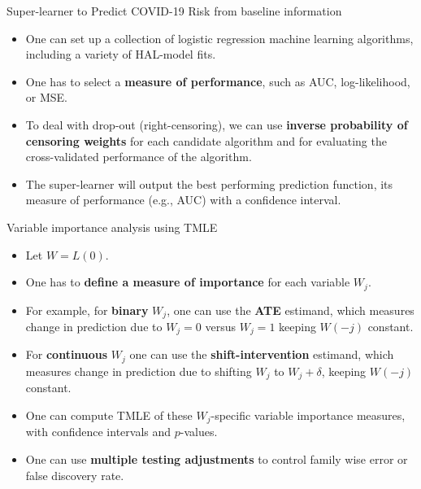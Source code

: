 \documentclass[t]{beamer}
\begin{document}
\begin{frame}{Super-learner to Predict COVID-19 Risk from baseline information}
\begin{itemize}
\item One can set up a collection of logistic regression machine learning algorithms, including a variety of HAL-model fits.
\item One has to select a {\bf measure of performance}, such as AUC, log-likelihood, or MSE.
\item To deal with drop-out (right-censoring), we can use {\bf inverse probability of censoring weights} for each candidate algorithm and for evaluating the cross-validated performance of the algorithm.
\item The super-learner will output the best performing prediction function, its measure of performance (e.g., AUC) with a confidence interval. 
\end{itemize}
\end{frame}

\begin{frame}{Variable importance analysis using TMLE}
\begin{itemize}
\item Let $W=L(0)$.
\item One has to {\bf define a measure of importance} for each variable $W_j$. 
\item For example, for {\bf binary} $W_j$, one can use the {\bf ATE} estimand, which measures change in prediction due to $W_j=0$ versus $W_j=1$ keeping $W(-j)$ constant.
\item For {\bf continuous} $W_j$ one can use the {\bf shift-intervention} estimand, which measures change in prediction due to shifting  $W_j$ to $W_j+\delta$, keeping $W(-j)$ constant.
\item One can compute TMLE of these $W_j$-specific variable importance measures, with confidence intervals and $p$-values.
\item One can use {\bf multiple testing adjustments} to control family wise error or false discovery rate.
\end{itemize}
\end{frame}

\end{document}
